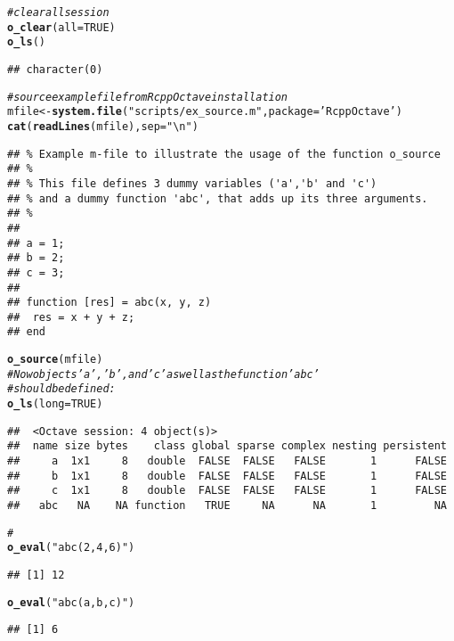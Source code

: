 \documentclass[english,10pt,a4paper]{article}\usepackage[]{graphicx}\usepackage[]{color}
\makeatletter
\newcommand{\hlnum}[1]{\textcolor[rgb]{0.686,0.059,0.569}{#1}}%
\newcommand{\hlstr}[1]{\textcolor[rgb]{0.192,0.494,0.8}{#1}}%
\newcommand{\hlcom}[1]{\textcolor[rgb]{0.678,0.584,0.686}{\textit{#1}}}%
\newcommand{\hlstd}[1]{\textcolor[rgb]{0.345,0.345,0.345}{#1}}%
\newcommand{\hlkwb}[1]{\textcolor[rgb]{0.69,0.353,0.396}{#1}}%
\newcommand{\hlkwc}[1]{\textcolor[rgb]{0.333,0.667,0.333}{#1}}%
\newcommand{\hlkwd}[1]{\textcolor[rgb]{0.737,0.353,0.396}{\textbf{#1}}}%
\newenvironment{kframe}{%
 \def\at@end@of@kframe{}%
 \ifinner\ifhmode%
  \def\at@end@of@kframe{\end{minipage}}%
  \begin{minipage}{\columnwidth}%
 \fi\fi%
 \def\FrameCommand##1{\hskip\@totalleftmargin \hskip-\fboxsep
 \colorbox{shadecolor}{##1}\hskip-\fboxsep
     \hskip-\linewidth \hskip-\@totalleftmargin \hskip\columnwidth}%
 \MakeFramed {\advance\hsize-\width
   \@totalleftmargin\z@ \linewidth\hsize
   \@setminipage}}%
 {\par\unskip\endMakeFramed%
 \at@end@of@kframe}
\newenvironment{knitrout}{}{} %
\makeatother
\begin{document}
\begin{knitrout}
\color{fgcolor}\begin{kframe}
\begin{alltt}
\hlcom{# clear all session }
\hlkwd{o_clear}\hlstd{(}\hlkwc{all}\hlstd{=}\hlnum{TRUE}\hlstd{)}
\hlkwd{o_ls}\hlstd{()}
\end{alltt}
\begin{verbatim}
## character(0)
\end{verbatim}
\begin{alltt}
\hlcom{# source example file from RcppOctave installation}
\hlstd{mfile} \hlkwb{<-} \hlkwd{system.file}\hlstd{(}\hlstr{"scripts/ex_source.m"}\hlstd{,} \hlkwc{package}\hlstd{=}\hlstr{'RcppOctave'}\hlstd{)}
\hlkwd{cat}\hlstd{(}\hlkwd{readLines}\hlstd{(mfile),} \hlkwc{sep}\hlstd{=}\hlstr{"\textbackslash{}n"}\hlstd{)}
\end{alltt}
\begin{verbatim}
## % Example m-file to illustrate the usage of the function o_source
## %
## % This file defines 3 dummy variables ('a','b' and 'c') 
## % and a dummy function 'abc', that adds up its three arguments.
## % 
## 
## a = 1;
## b = 2;
## c = 3;
## 
## function [res] = abc(x, y, z)
## 	res = x + y + z; 
## end
\end{verbatim}
\begin{alltt}
\hlkwd{o_source}\hlstd{(mfile)}
\hlcom{# Now objects 'a', 'b', and 'c' as well as the function 'abc'}
\hlcom{# should be defined:}
\hlkwd{o_ls}\hlstd{(}\hlkwc{long}\hlstd{=}\hlnum{TRUE}\hlstd{)}
\end{alltt}
\begin{verbatim}
##  <Octave session: 4 object(s)>
##  name size bytes    class global sparse complex nesting persistent
##     a  1x1     8   double  FALSE  FALSE   FALSE       1      FALSE
##     b  1x1     8   double  FALSE  FALSE   FALSE       1      FALSE
##     c  1x1     8   double  FALSE  FALSE   FALSE       1      FALSE
##   abc   NA    NA function   TRUE     NA      NA       1         NA
\end{verbatim}
\begin{alltt}
\hlcom{# }
\hlkwd{o_eval}\hlstd{(}\hlstr{"abc(2, 4, 6)"}\hlstd{)}
\end{alltt}
\begin{verbatim}
## [1] 12
\end{verbatim}
\begin{alltt}
\hlkwd{o_eval}\hlstd{(}\hlstr{"abc(a, b, c)"}\hlstd{)}
\end{alltt}
\begin{verbatim}
## [1] 6
\end{verbatim}
\end{kframe}
\end{knitrout}
\end{document}
